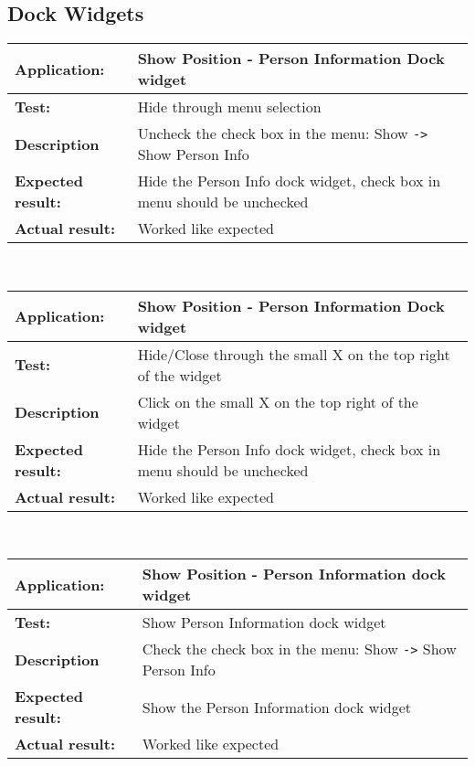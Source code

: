   \subsection{Dock Widgets}
   \begin{tabular}{|p{3.5cm}|p{10.5cm}|}
    \hline
     \textbf{Application:}	& Show Position - Person Information Dock widget\\
    \hline
     \textbf{Test:}		& Hide through menu selection\\
    \hline
     \textbf{Description}	& Uncheck the check box in the menu: Show \verb=->= Show Person Info\\
    \hline
     \textbf{Expected result:}	& Hide the Person Info dock widget, check box in menu should be unchecked\\
    \hline
     \textbf{Actual result:}	& Worked like expected\\
    \hline
   \end{tabular}\\
   \begin{tabular}{|p{3.5cm}|p{10.5cm}|}
    \hline
     \textbf{Application:}	& Show Position - Person Information Dock widget\\
    \hline
     \textbf{Test:}		& Hide/Close through the small X on the top right of the widget\\
    \hline
     \textbf{Description}	& Click on the small X on the top right of the widget\\
    \hline
     \textbf{Expected result:}	& Hide the Person Info dock widget, check box in menu should be unchecked\\
    \hline
     \textbf{Actual result:}	& Worked like expected\\
    \hline
   \end{tabular}\\
   \begin{tabular}{|p{3.5cm}|p{10.5cm}|}
    \hline
     \textbf{Application:}	& Show Position - Person Information dock widget\\
    \hline
     \textbf{Test:}		& Show Person Information dock widget\\
    \hline
     \textbf{Description}	& Check the check box in the menu: Show \verb=->= Show Person Info\\
    \hline
     \textbf{Expected result:}	& Show the Person Information dock widget\\
    \hline
     \textbf{Actual result:}	& Worked like expected\\
    \hline
   \end{tabular}\\

